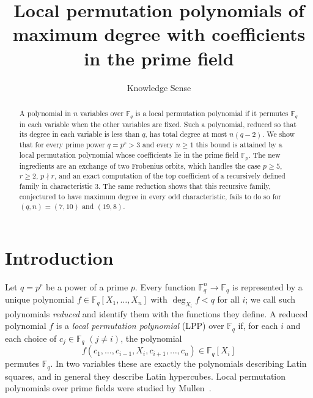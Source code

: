 \documentclass[11pt]{amsart}
\theoremstyle{definition}
\theoremstyle{remark}
\newcommand{\F}{\mathbb{F}}
\begin{document}
\title[Maximum-degree local permutation polynomials]{Local permutation polynomials of maximum degree with coefficients in the prime field}

\author{Knowledge Sense}
\address{Knowledge Sense}


\begin{abstract}
A polynomial in $n$ variables over $\F_q$ is a local permutation polynomial if it permutes $\F_q$ in each variable when the other variables are fixed. Such a polynomial, reduced so that its degree in each variable is less than $q$, has total degree at most $n(q-2)$. We show that for every prime power $q=p^r>3$ and every $n\ge 1$ this bound is attained by a local permutation polynomial whose coefficients lie in the prime field $\F_p$. The new ingredients are an exchange of two Frobenius orbits, which handles the case $p\ge 5$, $r\ge 2$, $p\nmid r$, and an exact computation of the top coefficient of a recursively defined family in characteristic $3$. The same reduction shows that this recursive family, conjectured to have maximum degree in every odd characteristic, fails to do so for $(q,n)=(7,10)$ and $(19,8)$.
\end{abstract}

\maketitle

\section{Introduction}

Let $q=p^r$ be a power of a prime $p$. Every function $\F_q^n\to\F_q$ is represented by a unique polynomial $f\in\F_q[X_1,\dots,X_n]$ with $\deg_{X_i}f<q$ for all $i$; we call such polynomials \emph{reduced} and identify them with the functions they define. A reduced polynomial $f$ is a \emph{local permutation polynomial} (LPP) over $\F_q$ if, for each $i$ and each choice of $c_j\in\F_q$ $(j\ne i)$, the polynomial
\[
f(c_1,\dots,c_{i-1},X_i,c_{i+1},\dots,c_n)\in\F_q[X_i]
\]
permutes $\F_q$. In two variables these are exactly the polynomials describing Latin squares, and in general they describe Latin hypercubes. Local permutation polynomials over prime fields were studied by Mullen~\cite{Mullen}.
\end{document}
